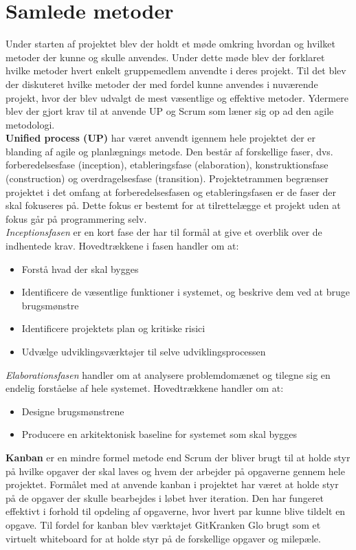 \section{Samlede metoder}
Under starten af projektet blev der holdt et møde omkring hvordan og hvilket metoder der kunne og skulle anvendes. Under dette møde blev der forklaret hvilke metoder hvert enkelt gruppemedlem anvendte i deres projekt. Til det blev der diskuteret hvilke metoder der med fordel kunne anvendes i nuværende projekt, hvor der blev udvalgt de mest væsentlige og effektive metoder. Ydermere blev der gjort krav til at anvende UP og Scrum som læner sig op ad den agile metodologi. \\
\textbf{ Unified process (UP)} har været anvendt igennem hele projektet der er blanding af agile og planlægnings metode. Den består af forskellige faser, dvs. forberedelsesfase (inception), etableringsfase (elaboration), konstruktionsfase (construction) og overdragelsesfase (transition). Projektetrammen begrænser projektet i det omfang at forberedelsesfasen og etableringsfasen er de faser der skal fokuseres på. Dette fokus er bestemt for at tilrettelægge et projekt uden at fokus går på programmering selv.\\ 
\emph{Inceptionsfasen} er en kort fase der har til formål at give et overblik over de indhentede krav. Hovedtrækkene i fasen handler om at:\\
\begin{itemize}
\item Forstå hvad der skal bygges
\item Identificere de væsentlige funktioner i systemet, og beskrive dem ved at bruge brugsmønstre
\item Identificere projektets plan og kritiske risici
\item Udvælge udviklingsværktøjer til selve udviklingsprocessen
\end{itemize}
\emph{Elaborationsfasen} handler om at analysere problemdomænet og tilegne sig en endelig forståelse af hele systemet. Hovedtrækkene handler om at: \\
\begin{itemize}
\item Designe brugsmønstrene
\item Producere en arkitektonisk baseline for systemet som skal bygges
\end{itemize}
\textbf{Kanban} er en mindre formel metode end Scrum der bliver brugt til at holde styr på hvilke opgaver der skal laves og hvem der arbejder på opgaverne gennem hele projektet. Formålet med at anvende kanban i projektet har været at holde styr på de opgaver der skulle bearbejdes i løbet hver iteration. Den har fungeret effektivt i forhold til opdeling af opgaverne, hvor hvert par kunne blive tildelt en opgave. Til fordel for kanban blev værktøjet GitKranken Glo brugt som et virtuelt whiteboard for at holde styr på de forskellige opgaver og milepæle. \\
